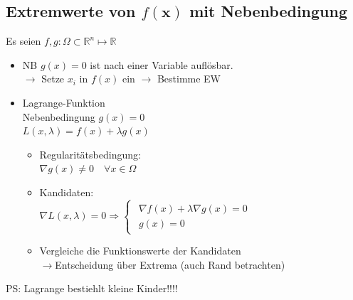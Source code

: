 \documentclass[6pt,a4paper]{scrartcl}
\renewcommand{\vec}[1]{\ensuremath{\boldsymbol {#1}}}											%
\newcommand{\Ra}[0]{\ensuremath{\Rightarrow}}									%
\newcommand{\ra}[0]{\ensuremath{\rightarrow}} 									%
\newcommand{\R}{\ensuremath{\mathbb R}}
\begin{document}
\begin{multicols*}{4}
\subsection{Extremwerte von $f(\vec x)$ mit Nebenbedingung}
Es seien $f,g:\Omega \subset \R^n \mapsto \R$
\begin{itemize} \itemsep0pt
	\item NB $g(x) = 0$ ist nach einer Variable auflösbar. \\
	$\ra$ Setze $x_i$ in $f(x)$ ein $\ra$ Bestimme EW
	\item Lagrange-Funktion \\
	Nebenbedingung $g(x) = 0$\\
	$\boxed{L(x, \lambda) = f(x) + \lambda g(x)}$
	\begin{itemize} \itemsep0pt
		\item Regularitätsbedingung: \\
		$\nabla{g(x)} \neq 0 \quad \forall x \in \Omega$
		\item Kandidaten: \\
		$\nabla{L(x, \lambda)} = 0 \Ra \begin{cases}
		\begin{array}{r}
		\nabla{f(x)} + \lambda\nabla{g(x)} = 0 \\
		g(x) = 0
		\end{array}
		\end{cases}$
		\item Vergleiche die Funktionswerte der Kandidaten \\
		\ra Entscheidung über Extrema (auch Rand betrachten)
	\end{itemize}
\end{itemize}
PS: Lagrange bestiehlt kleine Kinder!!!!





\end{multicols*}
\end{document}
